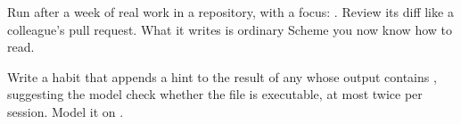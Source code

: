 \begin{tip}
Run  after a week of real work in a repository, with a
focus: . Review its diff like a
colleague's pull request. What it writes is ordinary Scheme you now know
how to read.
\end{tip}

\begin{puzzle}
Write a habit that appends a hint to the result of any 
whose output contains , suggesting the model check
whether the file is executable, at most twice per session. Model it on
.
\end{puzzle}
